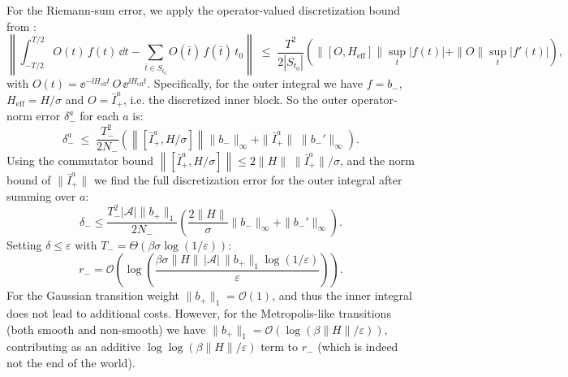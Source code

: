 For the Riemann-sum error, we apply the operator-valued discretization bound from \cite[Lemma III.1]{chen2023efficient}:
\begin{equation}\label{eq:riemann-sum-operator}
    \left\|\int_{-T/2}^{T/2} O(t)\,f(t)\,\dd t - \sum_{\bar{t}\in S_{t_0}} O(\bar{t})\,f(\bar{t})\,t_0\right\| \;\leq\; \frac{T^2}{2|S_{t_0}|}\!\left(\|[O, H_\text{eff}]\|\sup_t|f(t)| + \|O\|\sup_t|f'(t)|\right),
\end{equation}
with $O(t) = \ee^{-\ii H_\text{eff} t} \,O\, \ee^{\ii H_\text{eff} t}$. Specifically, for the outer integral we have $f = b_-$, $H_\text{eff} = H / \sigma$ and $O = \bar{I}^a_+$, i.e. the discretized inner block. So the outer operator-norm error $\delta_-^a$ for each $a$ is:
\begin{equation}
    \delta^a_- \;\leq\; \frac{T_-^2}{2N_-}\left( \left\|[\bar{I}^a_+, H / \sigma]\right\|\|b_-\|_\infty + \|\bar{I}^a_+ \|\; \|b_-'\|_\infty\right).
\end{equation}
Using the commutator bound $\left\|[\bar{I}^a_+, H / \sigma]\right\|\leq 2 \|H\|\; \|\bar{I}^a_+\| / \sigma$, and the norm bound of $\|\bar{I}^a_+\|$ we find the full discretization error for the outer integral after summing over $a$: 
\begin{equation}
    \delta_- \leq \frac{T_-^2 |\mathcal{A}| \|b_+\|_1}{2 N_-} \left(\frac{2\|H\|}{\sigma}\|b_-\|_\infty + \|b_-'\|_\infty\right).
\end{equation}
Setting $\delta \leq \varepsilon$ with $T_- = \Theta(\beta\sigma\log(1/\varepsilon))$:
\begin{equation} \label{eq:r_-}
    r_- = \mathcal{O}\!\left(\log\!\left(\frac{\beta\sigma\|H\|\,|\mathcal{A}|\,\|b_+\|_1 \log(1/\varepsilon)}{\varepsilon}\right)\right).
\end{equation}
For the Gaussian transition weight $\|b_+\|_1 = \mathcal{O}(1)$, and thus the inner integral does not lead to additional costs. However, for the Metropolis-like transitions (both smooth and non-smooth) we have $\|b_+\|_1 = \mathcal{O}(\log(\beta\|H\|/\varepsilon))$, contributing as an additive $\log\log(\beta\|H\|/\varepsilon)$ term to $r_-$ (which is indeed not the end of the world).

